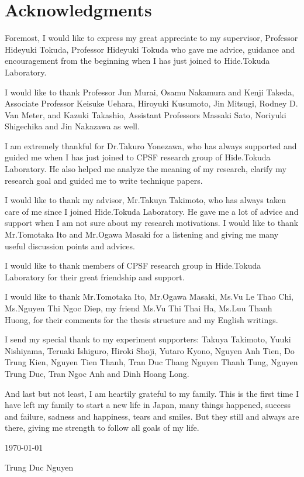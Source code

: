 \chapter*{Acknowledgments}
Foremost, I would like to express my great appreciate to my supervisor, Professor Hideyuki Tokuda, Professor Hideyuki Tokuda who gave me advice, guidance and encouragement from the beginning when I has just joined to Hide.Tokuda Laboratory.

I would like to thank Professor Jun Murai, Osamu Nakamura and Kenji Takeda, Associate Professor Keisuke Uehara, Hiroyuki Kusumoto, Jin Mitsugi, Rodney D. Van Meter, and Kazuki Takashio, Assistant 
Professors Massaki Sato, Noriyuki Shigechika and Jin Nakazawa as well.

I am extremely thankful for Dr.Takuro Yonezawa, who has always supported and guided me when I has just joined to CPSF research group of Hide.Tokuda Laboratory. He also helped me analyze the meaning of my research, clarify my research goal and guided me to write technique papers.

I would like to thank my advisor, Mr.Takuya Takimoto, who has always taken care of me since I joined Hide.Tokuda Laboratory. He gave me a lot of advice and support when I am not sure about my research motivations. I would like to thank Mr.Tomotaka Ito and Mr.Ogawa Masaki for a listening and giving me many useful discussion points and advices.

I would like to thank members of CPSF research group in Hide.Tokuda Laboratory for their great friendship and support.

I would like to thank Mr.Tomotaka Ito, Mr.Ogawa Masaki, Ms.Vu Le Thao Chi, Ms.Nguyen Thi Ngoc Diep, my friend Ms.Vu Thi Thai Ha, Ms.Luu Thanh Huong, for their comments for the thesis structure and my English writings.

I send my special thank to my experiment supporters: Takuya Takimoto, Yuuki Nishiyama, Teruaki Ishiguro, Hiroki Shoji, Yutaro Kyono, Nguyen Anh Tien, Do Trung Kien, Nguyen Tien Thanh, Tran Duc Thang Nguyen Thanh Tung, Nguyen Trung Duc, Tran Ngoc Anh and Dinh Hoang Long.

And last but not least, I am heartily grateful to my family. This is the first time I have left my family to start a new life in Japan, many things happened, success and failure, sadness and happiness, tears and smiles. But they still and always are there, giving me strength to follow all goals of my life.

\begin{flushright}
\today

Trung Duc Nguyen 
\end{flushright}

